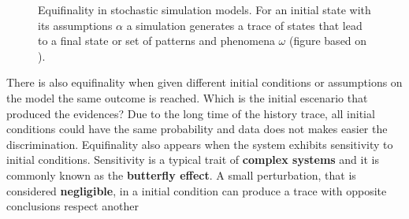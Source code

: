 \documentclass[11pt,oneside,a4paper,openright]{report}
\begin{document}
\begin{figure}[h]
\centering
\setlength\fboxsep{0pt}
\setlength\fboxrule{0.5pt}
\caption{Equifinality in stochastic simulation models. For an initial state 
	with its assumptions $\alpha$ a simulation generates a trace of states 
	that lead to a final state or set of patterns and phenomena $\omega$ (figure based on \cite{Premo2010}).}
\label{fig:Equifinality1}
\end{figure}
%
There is also equifinality when given different initial conditions or assumptions on the model the same outcome is reached. Which is the initial escenario that produced the evidences? Due to the long time of the history trace, all initial conditions could have the same probability and data does not makes easier the discrimination. Equifinality also appears when the system exhibits sensitivity to initial conditions. Sensitivity is a typical trait of \textbf{complex systems} and it is commonly known as the \textbf{butterfly effect}. A small perturbation, that is considered \textbf{negligible}, in a initial condition can produce a trace with opposite conclusions respect another 
\end{document}
